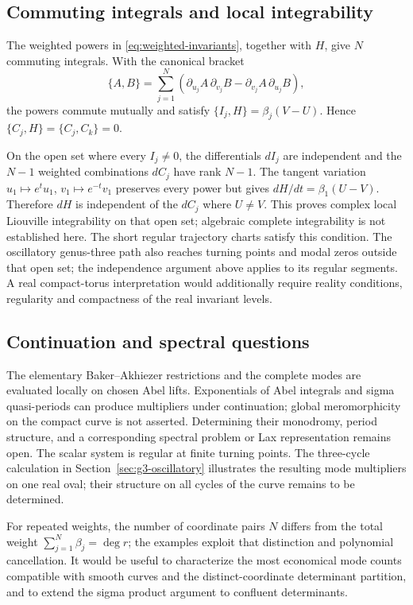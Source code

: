\documentclass[11pt]{article}
\begin{document}
\subsection{Commuting integrals and local integrability}

The weighted powers in \eqref{eq:weighted-invariants}, together with $H$, give $N$ commuting integrals. With the canonical bracket
\[
\{A,B\}=\sum_{j=1}^{N}\left(\partial_{u_j}A\,\partial_{v_j}B
-\partial_{v_j}A\,\partial_{u_j}B\right),
\]
the powers commute mutually and satisfy $\{I_j,H\}=\beta_j(V-U)$. Hence $\{C_j,H\}=\{C_j,C_k\}=0$.

On the open set where every $I_j\ne0$, the differentials $dI_j$ are independent and the $N-1$ weighted combinations $dC_j$ have rank $N-1$. The tangent variation $u_1\mapsto e^t u_1$, $v_1\mapsto e^{-t}v_1$ preserves every power but gives $dH/dt=\beta_1(U-V)$. Therefore $dH$ is independent of the $dC_j$ where $U\ne V$. This proves complex local Liouville integrability on that open set; algebraic complete integrability is not established here. The short regular trajectory charts satisfy this condition. The oscillatory genus-three path also reaches turning points and modal zeros outside that open set; the independence argument above applies to its regular segments. A real compact-torus interpretation would additionally require reality conditions, regularity and compactness of the real invariant levels.

\subsection{Continuation and spectral questions}

The elementary Baker--Akhiezer restrictions and the complete modes are evaluated locally on chosen Abel lifts. Exponentials of Abel integrals and sigma quasi-periods can produce multipliers under continuation; global meromorphicity on the compact curve is not asserted. Determining their monodromy, period structure, and a corresponding spectral problem or Lax representation remains open. The scalar system is regular at finite turning points. The three-cycle calculation in Section~\ref{sec:g3-oscillatory} illustrates the resulting mode multipliers on one real oval; their structure on all cycles of the curve remains to be determined.

For repeated weights, the number of coordinate pairs $N$ differs from the total weight $\sum_{j=1}^{N}\beta_j=\deg r$; the examples exploit that distinction and polynomial cancellation. It would be useful to characterize the most economical mode counts compatible with smooth curves and the distinct-coordinate determinant partition, and to extend the sigma product argument to confluent determinants.
\end{document}
